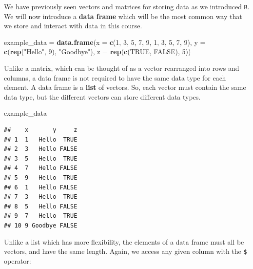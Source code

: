 \documentclass[]{book}
\newenvironment{Shaded}{\begin{snugshade}}{\end{snugshade}}
\newcommand{\KeywordTok}[1]{\textcolor[rgb]{0.13,0.29,0.53}{\textbf{#1}}}
\newcommand{\DataTypeTok}[1]{\textcolor[rgb]{0.13,0.29,0.53}{#1}}
\newcommand{\DecValTok}[1]{\textcolor[rgb]{0.00,0.00,0.81}{#1}}
\newcommand{\StringTok}[1]{\textcolor[rgb]{0.31,0.60,0.02}{#1}}
\newcommand{\OtherTok}[1]{\textcolor[rgb]{0.56,0.35,0.01}{#1}}
\newcommand{\OperatorTok}[1]{\textcolor[rgb]{0.81,0.36,0.00}{\textbf{#1}}}
\newcommand{\NormalTok}[1]{#1}
\theoremstyle{definition}
\theoremstyle{definition}
\theoremstyle{definition}
\theoremstyle{remark}
\begin{document}
We have previously seen vectors and matrices for storing data as we
introduced \texttt{R}. We will now introduce a \textbf{data frame} which
will be the most common way that we store and interact with data in this
course.

\begin{Shaded}
\begin{Highlighting}[]
\NormalTok{example_data =}\StringTok{ }\KeywordTok{data.frame}\NormalTok{(}\DataTypeTok{x =} \KeywordTok{c}\NormalTok{(}\DecValTok{1}\NormalTok{, }\DecValTok{3}\NormalTok{, }\DecValTok{5}\NormalTok{, }\DecValTok{7}\NormalTok{, }\DecValTok{9}\NormalTok{, }\DecValTok{1}\NormalTok{, }\DecValTok{3}\NormalTok{, }\DecValTok{5}\NormalTok{, }\DecValTok{7}\NormalTok{, }\DecValTok{9}\NormalTok{),}
                          \DataTypeTok{y =} \KeywordTok{c}\NormalTok{(}\KeywordTok{rep}\NormalTok{(}\StringTok{"Hello"}\NormalTok{, }\DecValTok{9}\NormalTok{), }\StringTok{"Goodbye"}\NormalTok{),}
                          \DataTypeTok{z =} \KeywordTok{rep}\NormalTok{(}\KeywordTok{c}\NormalTok{(}\OtherTok{TRUE}\NormalTok{, }\OtherTok{FALSE}\NormalTok{), }\DecValTok{5}\NormalTok{))}
\end{Highlighting}
\end{Shaded}

Unlike a matrix, which can be thought of as a vector rearranged into
rows and columns, a data frame is not required to have the same data
type for each element. A data frame is a \textbf{list} of vectors. So,
each vector must contain the same data type, but the different vectors
can store different data types.

\begin{Shaded}
\begin{Highlighting}[]
\NormalTok{example_data}
\end{Highlighting}
\end{Shaded}

\begin{verbatim}
##    x       y     z
## 1  1   Hello  TRUE
## 2  3   Hello FALSE
## 3  5   Hello  TRUE
## 4  7   Hello FALSE
## 5  9   Hello  TRUE
## 6  1   Hello FALSE
## 7  3   Hello  TRUE
## 8  5   Hello FALSE
## 9  7   Hello  TRUE
## 10 9 Goodbye FALSE
\end{verbatim}

Unlike a list which has more flexibility, the elements of a data frame
must all be vectors, and have the same length. Again, we access any
given column with the \texttt{\$} operator:

\begin{Shaded}
\end{Shaded}
\end{document}
